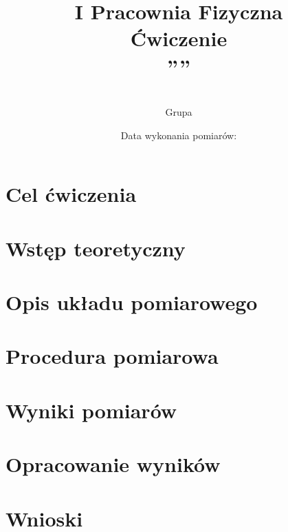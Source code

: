 \documentclass[12pt, a4paper]{article}
\title{
    \large I Pracownia Fizyczna \\[0.5em]
    \textbf{Ćwiczenie \nrCwiczenia} \\[0.3em]
    \LARGE \tytul\space''\codeword''
}
\author{
    \autor\\
     Grupa \nrGrupy}
\date{
    Data wykonania pomiarów: \dataWykonania\\
}
\begin{document}

\maketitle
\thispagestyle{empty}
\newpage

\section{Cel ćwiczenia}



\section{Wstęp teoretyczny}



\section{Opis układu pomiarowego}



\section{Procedura pomiarowa}



\section{Wyniki pomiarów}



\section{Opracowanie wyników}



\section{Wnioski}
\end{document}
